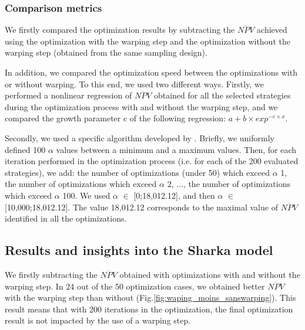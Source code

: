 \subsubsection{Comparison metrics}

We firstly compared the optimization results by subtracting the $\overline{NPV}$ achieved using the optimization with the warping step and the optimization without the warping step (obtained from the same sampling design). 

In addition, we compared the optimization speed between the optimizations with or without warping. To this end, we used two different ways. 
Firstly, we performed a nonlinear regression of $\overline{NPV}$ obtained for all the selected strategies during the optimization process with 
and without the warping step, and we compared the growth parameter c of the following regression:
$a+b \times exp^{-c\times x}$.

Secondly, we used a specific algorithm developed by . Briefly, we uniformly defined 100 $\alpha$ values between a minimum and a maximum values. 
Then, for each iteration performed in the optimization process (i.e. for each of the 200 evaluated strategies), we add: 
the number of optimizations (under 50) which exceed $\alpha$ 1, the number of optimizations which exceed $\alpha$ 2, ..., 
the number of optimizations which exceed $\alpha$ 100. We used $\alpha$ $\in$ [0;18,012.12], and then $\alpha$ $\in$ [10,000;18,012.12]. 
The value 18,012.12 corresponds to the maximal value of $\overline{NPV}$ identified in all the optimizations.

\subsection{Results and insights into the Sharka model}

We firstly subtracting the $\overline{NPV}$ obtained with optimizations with and without the warping step. 
In 24 out of the 50 optimization cases, we obtained better $\overline{NPV}$ with the warping step than without (Fig.\ref{fig:waping_moins_sanswarping}). 
This result means that with 200 iterations in the optimization, the final optimization result is not impacted by the use of a warping step.

